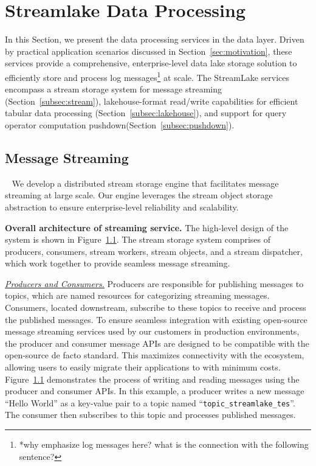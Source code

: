 \section{Streamlake Data Processing} 
\label{sec:dataeva}

In this Section, we present the data processing services  in the data layer. Driven by practical application scenarios discussed in Section~\ref{sec:motivation}, these services provide a comprehensive, enterprise-level data lake storage solution  to efficiently store and process  log messages\footnote{*why emphasize log messages here? what is the connection with the following sentence?} at scale. The StreamLake services encompass a stream storage system for message streaming (Section~\ref{subsec:stream}), lakehouse-format read/write capabilities for efficient tabular data processing (Section~\ref{subsec:lakehouse}), and support for query operator computation pushdown(Section~\ref{subsec:pushdown}).


\subsection{Message Streaming}~\label{subsec:stream}
We develop a  distributed stream storage engine that facilitates message streaming at large scale. Our engine leverages the stream object storage abstraction to ensure enterprise-level reliability and scalability.


\noindent\textbf{Overall architecture of streaming service.} The high-level design of the system is shown in Figure~\ref{}. The stream storage system comprises of producers, consumers, stream workers, stream objects, and a stream dispatcher, which work together to provide seamless message streaming.


\noindent\underline{\textit{Producers and Consumers.}} Producers are responsible for publishing messages to topics, which are named resources for categorizing streaming messages. Consumers, located downstream, subscribe to these topics to receive and process the published messages. To ensure seamless integration with existing open-source message streaming services used by our customers in production environments, the producer and consumer message APIs are designed to be compatible with the open-source de facto standard. This maximizes connectivity with the ecosystem, allowing users to easily migrate their applications to \sys with minimum costs. Figure~\ref{}  demonstrates the process of writing and reading messages using the producer and consumer APIs. In this example, a producer writes a new message ``Hello World'' as a key-value pair to a topic named ``\texttt{topic\_streamlake\_tes}''. The consumer then subscribes to this topic and processes published messages.

